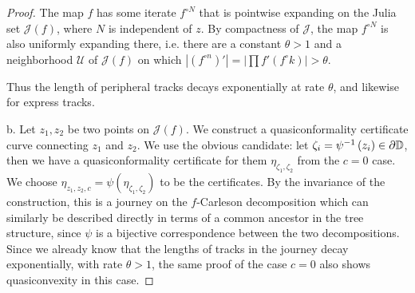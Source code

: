 \begin{proof}
The map $f$ has some iterate $f^{\circ N}$ that is pointwise expanding on the Julia set $\mathcal{J}(f)$, where $N$ is independent of $z$.
By compactness of $\mathcal J$, the map $f^{\circ N}$ is also uniformly expanding there, i.e. there are a constant $\theta>1$ and a neighborhood $\mathcal{U}$ of $\mathcal{J}(f)$ on which $\left|(f^{\circ n})'\right|=|\prod f'(f^\circ k) |>\theta$. 

Thus the length of peripheral tracks decays exponentially at rate
$\theta$, and likewise for express tracks.

b.  Let $z_{1},z_{2}$ be two points on $\mathcal{J}(f)$. We construct
a quasiconformality certificate curve connecting $z_{1}$ and $z_{2}$.
We use the obvious candidate: let $\zeta_{i}=\psi^{-1}\left(z_{i}\right)\in\partial\mathbb{D}$,
then we have a quasiconformality certificate for them $\eta_{\zeta_{1},\zeta_{2}}$
from the $c=0$ case. We choose $\eta_{z_{1},z_{2},c}=\psi(\eta_{\zeta_{1},\zeta_{2}})$
to be the certificates. By the invariance of the construction, this is
a journey on the $f$-Carleson decomposition which can similarly
be described directly in terms of a common ancestor in the tree structure,
since $\psi$ is a bijective correspondence between the two decompositions.
Since we already know that the lengths of tracks in the journey decay
exponentially, with rate $\theta>1$, the same proof of the case $c=0$
also shows quasiconvexity in this case.
\end{proof}

